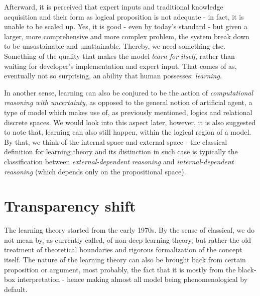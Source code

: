 Afterward, it is perceived that expert inputs and traditional knowledge acquisition and their form as logical proposition is not adequate - in fact, it is unable to be scaled up. Yes, it is good - even by today's standard - but given a larger, more comprehensive and more complex problem, the system break down to be unsustainable and unattainable. Thereby, we need something else. Something of the quality that makes the model \textit{learn for itself}, rather than waiting for developer's implementation and expert input. That comes of as, eventually not so surprising, an ability that human possesses: \textit{learning}. 

In another sense, learning can also be conjured to be the action of \textit{computational reasoning with uncertainty}, as opposed to the general notion of artificial agent, a type of model which makes use of, as previously mentioned, logics and relational discrete spaces. We would look into this aspect later, however, it is also suggested to note that, learning can also still happen, within the logical region of a model. By that, we think of the internal space and external space - the classical definition for learning theory and its distinction in such case is typically the classification between \textit{external-dependent reasoning} and \textit{internal-dependent reasoning} (which depends only on the propositional space). 

\section{Transparency shift}

The learning theory started from the early 1970s. By the sense of classical, we do not mean by, as currently called, of non-deep learning theory, but rather the old treatment of theoretical boundaries and rigorous formalization of the concept itself. The nature of the learning theory can also be brought back from certain proposition or argument, most probably, the fact that it is mostly from the black-box interpretation - hence making almost all model being phenomenological by default. 

